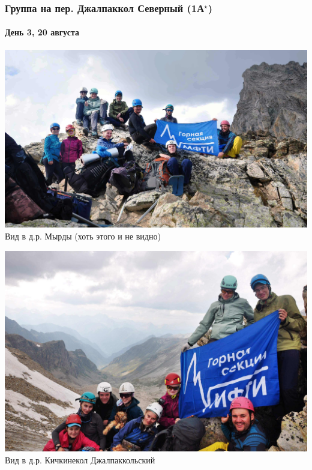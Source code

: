 \begin{frame}
	\frametitle{Группа на пер. Джалпаккол Северный (1А$^\star$)}
	\framesubtitle{День 3, 20 августа}
	{\tiny
		\begin{minipage}{\fourpicsize}
			\centering
			\includegraphics[width=\textwidth]{../pics/DSC_0063}			
			Вид в д.р. Мырды (хоть этого и не видно)
		\end{minipage}
		\hfill
		\begin{minipage}{\fourpicsize}
			\centering
			\includegraphics[width=\textwidth]{../pics/DSC_0069}			
			Вид в д.р. Кичкинекол Джалпаккольский
		\end{minipage}
		\vfill
	}
\end{frame}

